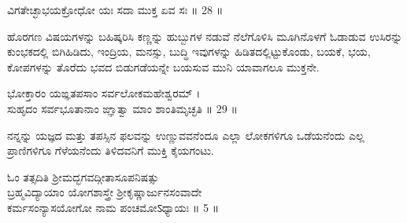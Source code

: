 ವಿಗತೇಚ್ಛಾಭಯಕ್ರೋಧೋ ಯಃ ಸದಾ ಮುಕ್ತ ಏವ ಸಃ ॥ 28 ॥
\begin{quoting}
ಹೊರಗಣ ವಿಷಯಗಳನ್ನು ಬಹಿಷ್ಕರಿಸಿ ಕಣ್ಣನ್ನು ಹುಬ್ಬುಗಳ ನಡುವೆ ನೆಲೆಗೊಳಿಸಿ ಮೂಗಿನೊಳಗೆ ಓಡಾಡುವ ಉಸಿರನ್ನು ಕುಂಭಕದಲ್ಲಿ ಬಿಗಿಹಿಡಿದು, ಇಂದ್ರಿಯ, ಮನಸ್ಸು, ಬುದ್ಧಿ ಇವುಗಳನ್ನು ಹಿಡಿತದಲ್ಲಿಟ್ಟುಕೊಂಡು, ಬಯಕೆ, ಭಯ, ಕೋಪಗಳನ್ನು ತೊರೆದು ಭವದ ಬಿಡುಗಡೆಯನ್ನೇ ಬಯಸುವ ಮುನಿ ಯಾವಾಗಲೂ ಮುಕ್ತನೇ.\\
\end{quoting}
ಭೋಕ್ತಾರಂ ಯಙ್ಞತಪಸಾಂ ಸರ್ವಲೋಕಮಹೇಶ್ವರಮ್ ।\\
ಸುಹೃದಂ ಸರ್ವಭೂತಾನಾಂ ಙ್ಞಾತ್ವಾ ಮಾಂ ಶಾಂತಿಮೃಚ್ಛತಿ ॥ 29 ॥
\begin{quoting}
ನನ್ನನ್ನು ಯಜ್ಞದ ಮತ್ತು ತಪಸ್ಸಿನ ಫಲವನ್ನು ಉಣ್ಣುವವನೆಂದೂ ಎಲ್ಲಾ ಲೋಕಗಳಿಗೂ ಒಡೆಯನೆಂದು ಎಲ್ಲ ಪ್ರಾಣಿಗಳಿಗೂ ಗೆಳೆಯನೆಂದು ತಿಳಿದವನಿಗೆ ಮುಕ್ತಿ ಕೈಯಗಂಟು.\\
\end{quoting}
\begin{center}
{\tiny\color{brown}
ಓಂ ತತ್ಸದಿತಿ ಶ್ರೀಮದ್ಭಗವದ್ಗೀತಾಸೂಪನಿಷತ್ಸು\\
ಬ್ರಹ್ಮವಿದ್ಯಾಯಾಂ ಯೋಗಶಾಸ್ತ್ರೇ ಶ್ರೀಕೃಷ್ಣಾರ್ಜುನಸಂವಾದೇ\\
ಕರ್ಮಸಂನ್ಯಾಸಯೋಗೋ ನಾಮ ಪಂಚಮೋऽಧ್ಯಾಯಃ ॥ 5 ॥\\}
\end{center}